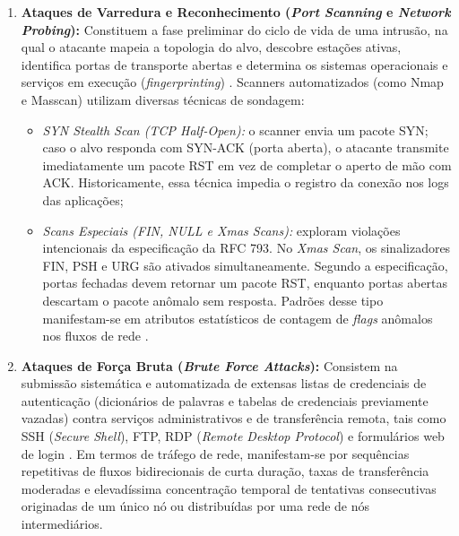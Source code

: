 \begin{enumerate}
    \item \textbf{Ataques de Varredura e Reconhecimento (\emph{Port Scanning} e \emph{Network Probing}):}
    Constituem a fase preliminar do ciclo de vida de uma intrusão, na qual o atacante mapeia a topologia do alvo, descobre estações ativas, identifica portas de transporte abertas e determina os sistemas operacionais e serviços em execução (\emph{fingerprinting}) \cite{netflow2020}. Scanners automatizados (como Nmap e Masscan) utilizam diversas técnicas de sondagem:
    \begin{itemize}
        \item \emph{SYN Stealth Scan (TCP Half-Open):} o scanner envia um pacote SYN; caso o alvo responda com SYN-ACK (porta aberta), o atacante transmite imediatamente um pacote RST em vez de completar o aperto de mão com ACK. Historicamente, essa técnica impedia o registro da conexão nos logs das aplicações;
        \item \emph{Scans Especiais (FIN, NULL e Xmas Scans):} exploram violações intencionais da especificação da RFC 793. No \emph{Xmas Scan}, os sinalizadores FIN, PSH e URG são ativados simultaneamente. Segundo a especificação, portas fechadas devem retornar um pacote RST, enquanto portas abertas descartam o pacote anômalo sem resposta. Padrões desse tipo manifestam-se em atributos estatísticos de contagem de \emph{flags} anômalos nos fluxos de rede \cite{standard2021}.
    \end{itemize}

    \item \textbf{Ataques de Força Bruta (\emph{Brute Force Attacks}):}
    Consistem na submissão sistemática e automatizada de extensas listas de credenciais de autenticação (dicionários de palavras e tabelas de credenciais previamente vazadas) contra serviços administrativos e de transferência remota, tais como SSH (\emph{Secure Shell}), FTP, RDP (\emph{Remote Desktop Protocol}) e formulários web de login \cite{Sharafaldin2018TowardGA}. Em termos de tráfego de rede, manifestam-se por sequências repetitivas de fluxos bidirecionais de curta duração, taxas de transferência moderadas e elevadíssima concentração temporal de tentativas consecutivas originadas de um único nó ou distribuídas por uma rede de nós intermediários.


\end{enumerate}
